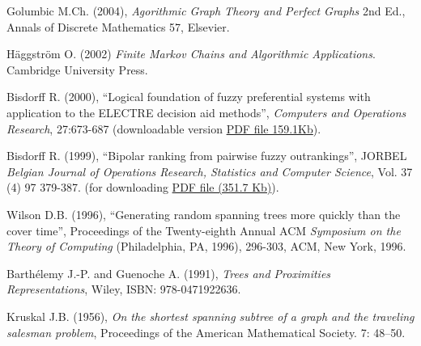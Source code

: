 \begin{thebibliography}{99.}
 Golumbic M.Ch. (2004), \emph{Agorithmic Graph Theory and Perfect Graphs} 2nd Ed., Annals of Discrete Mathematics 57, Elsevier.

 Häggström O. (2002) \emph{Finite Markov Chains and Algorithmic Applications}. Cambridge University Press.

 Bisdorff R. (2000), ``Logical foundation of fuzzy preferential systems with application to the ELECTRE decision aid methods'', \emph{Computers and Operations Research}, 27:673-687 (downloadable version \href{http://hdl.handle.net/10993/23724}{PDF file 159.1Kb}).

 Bisdorff R. (1999), ``Bipolar ranking from pairwise fuzzy outrankings'', JORBEL \emph{Belgian Journal of Operations Research, Statistics and Computer Science}, Vol. 37 (4) 97 379-387. (for downloading \href{http://hdl.handle.net/10993/38738}{PDF file (351.7 Kb)}).

 Wilson D.B. (1996), ``Generating random spanning trees more quickly than the cover time'', Proceedings of the Twenty-eighth Annual ACM \emph{Symposium on the Theory of Computing} (Philadelphia, PA, 1996), 296-303, ACM, New York, 1996.

 Barthélemy J.-P. and Guenoche A. (1991), \emph{Trees and Proximities Representations}, Wiley, ISBN: 978-0471922636.

 Kruskal J.B. (1956), \emph{On the shortest spanning subtree of a graph and the traveling salesman problem}, Proceedings of the American Mathematical Society. 7: 48–50.

\end{thebibliography}
